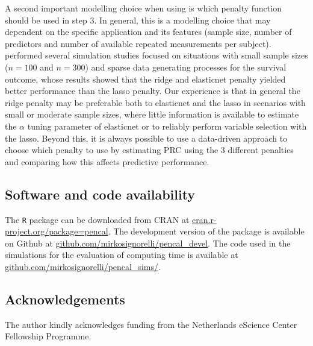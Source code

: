 A second important modelling choice when using  is which
penalty function should be used in step 3. In general, this is a
modelling choice that may dependent on the specific application and its
features (sample size, number of predictors and number of available
repeated measurements per subject). \citet{signorelli2021} performed
several simulation studies focused on situations with small sample sizes
(\(n = 100\) and \(n = 300\)) and sparse data generating processes for
the survival outcome, whose results showed that the ridge and elasticnet
penalty yielded better performance than the lasso penalty. Our
experience is that in general the ridge penalty may be preferable both
to elasticnet and the lasso in scenarios with small or moderate sample
sizes, where little information is available to estimate the \(\alpha\)
tuning parameter of elasticnet or to reliably perform variable selection
with the lasso. Beyond this, it is always possible to use a data-driven
approach to choose which penalty to use by estimating PRC using the 3
different penalties and comparing how this affects predictive
performance.

\subsection{Software and code
availability}\label{software-and-code-availability}

The \texttt{R} package  can be downloaded from CRAN at
\href{https://cran.r-project.org/package=pencal}{cran.r-project.org/package=pencal}.
The development version of the package is available on Github at
\href{https://github.com/mirkosignorelli/pencal_devel}{github.com/mirkosignorelli/pencal\_devel}.
The code used in the simulations for the evaluation of computing time is
available at\\
\href{https://github.com/mirkosignorelli/pencal_sims/}{github.com/mirkosignorelli/pencal\_sims/}.

\subsection{Acknowledgements}\label{acknowledgements}

The author kindly acknowledges funding from the Netherlands eScience
Center Fellowship Programme.



\address{%
Mirko Signorelli\\
Mathematical Institute, Leiden University\\%
Niels Bohrweg 1, 2333 CA Leiden (NL)\\
%
\url{https://mirkosignorelli.github.io}\\%
\textit{ORCiD: \href{https://orcid.org/0000-0002-8102-3356}{0000-0002-8102-3356}}\\%
\href{mailto:msignorelli.papers@gmail.com}{\nolinkurl{msignorelli.papers@gmail.com}}%
}
